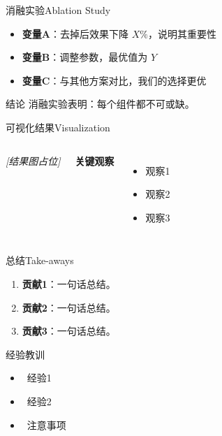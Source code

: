\begin{frame}{消融实验}{Ablation Study}
  \begin{itemize}
    \item \textbf{变量A}：去掉后效果下降 $X\%$，说明其重要性
    \item \textbf{变量B}：调整参数，最优值为 $Y$
    \item \textbf{变量C}：与其他方案对比，我们的选择更优
  \end{itemize}

  \vspace{0.6em}
  \begin{alertblock}{结论}
    消融实验表明：每个组件都不可或缺。
  \end{alertblock}
\end{frame}

\begin{frame}{可视化结果}{Visualization}
  \begin{columns}[T, onlytextwidth]
      \begin{center}
        {\Large\color{mustgray}\itshape [结果图占位]}
      \end{center}
      \textbf{\color{mustblue}关键观察}
      \begin{itemize}
        \footnotesize
        \item 观察1
        \item 观察2
        \item 观察3
      \end{itemize}
  \end{columns}
\end{frame}

\begin{frame}{总结}{Take-aways}
  \begin{enumerate}
    \item \textbf{贡献1}：一句话总结。
    \item \textbf{贡献2}：一句话总结。
    \item \textbf{贡献3}：一句话总结。
  \end{enumerate}

  \vspace{0.8em}
  \begin{block}{经验教训}
    \begin{itemize}
      \item \cmark\ 经验1
      \item \cmark\ 经验2
      \item \warn\ 注意事项
    \end{itemize}
  \end{block}
\end{frame}
